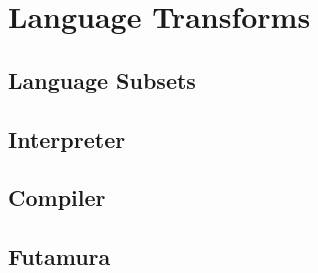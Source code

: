 \section{Language Transforms} %
\label{sec:transforms}
\subsection{Language Subsets} %
\label{sub:Language Subsets}

\subsection{Interpreter} %
\label{sub:Interpreter}

\subsection{Compiler} %
\label{sub:Compiler}

\subsection{Futamura} %
\label{sub:Futamura}

